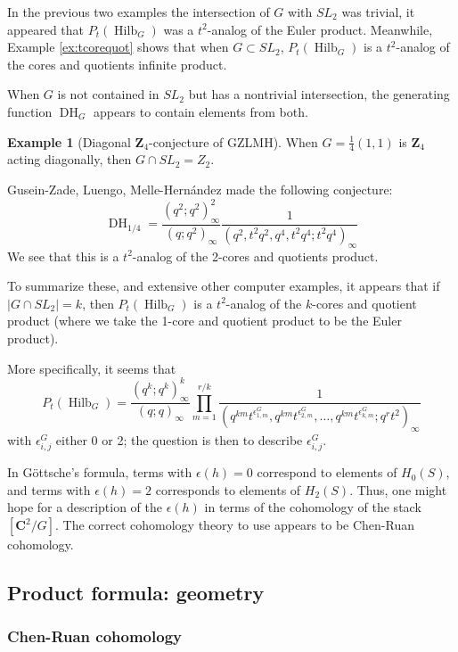 \documentclass{amsart}[12pt]
\theoremstyle{definition}
\newtheorem{example}[dummy]{Example}
\newcommand{\Z}{\mathbf{Z}}
\newcommand{\C}{\mathbf{C}}
\DeclareMathOperator{\Hilb}{Hilb}
\DeclareMathOperator{\DC}{DH}
\begin{document}
  In the previous two examples the intersection of $G$ with $SL_2$ was trivial, it appeared that $P_t(\Hilb_G)$ was a $t^2$-analog of the Euler product.  Meanwhile, Example \ref{ex:tcorequot} shows that when $G\subset SL_2$, $P_t(\Hilb_G)$ is a $t^2$-analog of the cores and quotients infinite product.

  When $G$ is not contained in $SL_2$ but has a nontrivial intersection, the generating function $\DC_G$ appears to contain elements from both.

\begin{example}[Diagonal $\Z_4$-conjecture of GZLMH]

  When $G=\frac{1}{4}(1,1)$ is $\Z_4$ acting diagonally, then $G\cap SL_2=Z_2$.

  Gusein-Zade, Luengo, Melle-Hern\'andez made the following conjecture:
$$\DC_{1/4}=\frac{(q^2;q^2)^2_\infty}{(q;q^2)_\infty} \frac{1}{(q^2, t^2q^2, q^4, t^2q^4;t^2q^4)_\infty}$$
We see that this is a $t^2$-analog of the 2-cores and quotients product.
\end{example}

To summarize these, and extensive other computer examples, it appears that if $|G\cap SL_2|=k$, then $P_t(\Hilb_G)$ is a $t^2$-analog of the $k$-cores and quotient product (where we take the 1-core and quotient product to be the Euler product).  

More specifically, it seems that
$$P_t(\Hilb_G)=\frac{(q^k;q^k)^k_\infty}{(q;q)_\infty}
\prod_{m=1}^{r/k}\frac{1}{(q^{km}t^{\epsilon^G_{1,m}},q^{km}t^{\epsilon^G_{2,m}},\dots,q^{km}t^{\epsilon^G_{k,m}} ;q^rt^2)_\infty}$$
with $\epsilon^G_{i,j}$ either 0 or 2; the question is then to describe $\epsilon^G_{i,j}$.


In G\"ottsche's formula, terms with $\epsilon(h)=0$ correspond to elements of $H_0(S)$, and terms with $\epsilon(h)=2$ corresponds to elements of $H_2(S)$. Thus, one might hope for a description of the $\epsilon(h)$ in terms of the cohomology of the stack $[\C^2/G]$.  The correct cohomology theory to use appears to be Chen-Ruan cohomology.

\subsection{Product formula: geometry}
\label{sec:prod-CR}

\subsubsection{Chen-Ruan cohomology}
\end{document}
